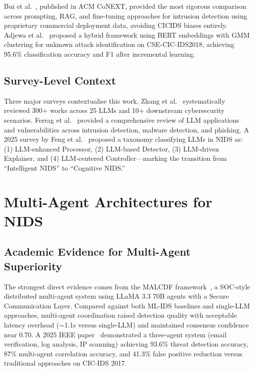 \documentclass[12pt, a4paper, oneside]{report}
\begin{document}
Bui et al.~\cite{bui2024systematic}, published in ACM CoNEXT, provided the most
rigorous comparison across prompting, RAG, and fine-tuning approaches for intrusion
detection using proprietary commercial deployment data, avoiding CICIDS biases
entirely. Adjewa et al.~\cite{adjewa2024continuous} proposed a hybrid framework
using BERT embeddings with GMM clustering for unknown attack identification on
CSE-CIC-IDS2018, achieving 95.6\% classification accuracy and F1 after incremental
learning.

\subsection{Survey-Level Context}

Three major surveys contextualise this work. Zhang et al.~\cite{zhang2024survey}
systematically reviewed 300+ works across 25 LLMs and 10+ downstream cybersecurity
scenarios. Ferrag et al.~\cite{ferrag2024generative} provided a comprehensive
review of LLM applications and vulnerabilities across intrusion detection, malware
detection, and phishing. A 2025 survey by Feng et al.~\cite{feng2025nids} proposed
a taxonomy classifying LLMs in NIDS as: (1) LLM-enhanced Processor, (2) LLM-based
Detector, (3) LLM-driven Explainer, and (4) LLM-centered Controller---marking the
transition from ``Intelligent NIDS'' to ``Cognitive NIDS.''


\section{Multi-Agent Architectures for NIDS}
\label{sec:multiagent-lit}

\subsection{Academic Evidence for Multi-Agent Superiority}

The strongest direct evidence comes from the MALCDF framework~\cite{malcdf2025}, a
SOC-style distributed multi-agent system using LLaMA 3.3 70B agents with a Secure
Communication Layer. Compared against both ML-IDS baselines and single-LLM
approaches, multi-agent coordination raised detection quality with acceptable
latency overhead ($\sim$1.1s versus single-LLM) and maintained consensus confidence
near 0.70. A 2025 IEEE paper~\cite{ieee2025multiagent} demonstrated a three-agent
system (email verification, log analysis, IP scanning) achieving 93.6\% threat
detection accuracy, 87\% multi-agent correlation accuracy, and 41.3\% false
positive reduction versus traditional approaches on CIC-IDS 2017.
\end{document}
